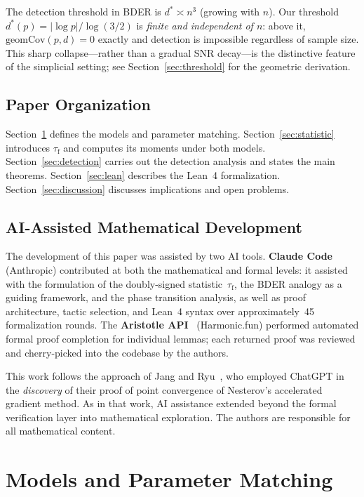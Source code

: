 \documentclass[reqno,12pt]{amsart}
\newcommand{\tauf}{\tau_{\mathrm{f}}}
\newcommand{\geomCov}{\mathrm{geomCov}}
\theoremstyle{plain}
\theoremstyle{definition}
\theoremstyle{remark}
\begin{document}
The detection threshold in BDER is $d^*\asymp n^3$ (growing with $n$). Our threshold
$d^*(p) = |\log p|/\log(3/2)$ is \emph{finite and independent of $n$}: above it,
$\geomCov(p,d) = 0$ exactly and detection is impossible regardless of sample size.
This sharp collapse---rather than a gradual SNR decay---is the distinctive feature of
the simplicial setting; see Section~\ref{sec:threshold} for the geometric derivation.

\subsection{Paper Organization}

Section~\ref{sec:models} defines the models and parameter matching.
Section~\ref{sec:statistic} introduces $\tauf$ and computes its moments under both models.
Section~\ref{sec:detection} carries out the detection analysis and states the main theorems.
Section~\ref{sec:lean} describes the Lean~4 formalization.
Section~\ref{sec:discussion} discusses implications and open problems.

\subsection{AI-Assisted Mathematical Development}\label{sec:ai}

The development of this paper was assisted by two AI tools.
\textbf{Claude Code}~\cite{ClaudeCode2025} (Anthropic) contributed at both the mathematical
and formal levels: it assisted with the formulation of the doubly-signed statistic~$\tauf$,
the BDER analogy as a guiding framework, and the phase transition analysis, as well as proof
architecture, tactic selection, and Lean~4 syntax over approximately~45 formalization rounds.
The \textbf{Aristotle API}~\cite{Aristotle2025} (Harmonic.fun) performed automated formal
proof completion for individual lemmas; each returned proof was reviewed and cherry-picked
into the codebase by the authors.

This work follows the approach of Jang and Ryu~\cite{JangRyu2026}, who employed ChatGPT in
the \emph{discovery} of their proof of point convergence of Nesterov's accelerated gradient
method. As in that work, AI assistance extended beyond the formal verification layer into
mathematical exploration. The authors are responsible for all mathematical content.

\section{Models and Parameter Matching}\label{sec:models}
\end{document}

